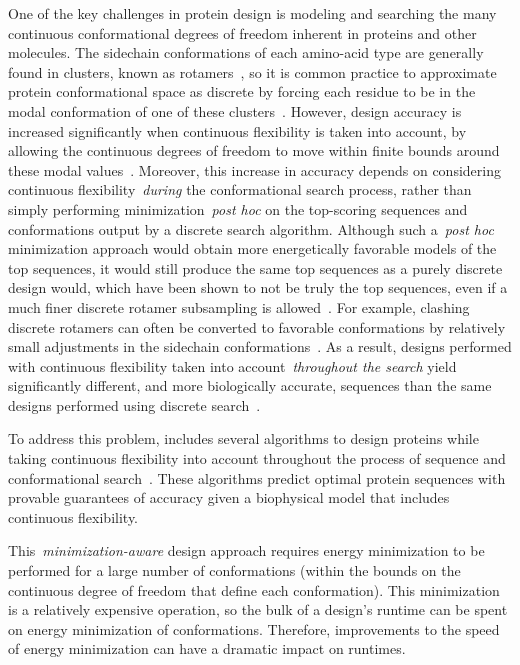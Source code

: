 One of the key challenges in protein design is modeling and searching the many continuous conformational degrees of freedom inherent in proteins and other molecules. The sidechain conformations of each amino-acid type are generally found in clusters, known as rotamers~\cite{rotamers}, so it is common practice to approximate protein conformational space as discrete by forcing each residue to be in the modal conformation of one of these clusters~\cite{DEE,DEE/A*}.  However, design accuracy is increased significantly when continuous flexibility is taken into account, by allowing the continuous degrees of freedom to move within finite bounds around these modal values~\cite{iMinDEE,DEEPer,OSPREY_MIE,BBK*}.  Moreover, this increase in accuracy depends on considering continuous flexibility~\textit{during} the conformational search process, rather than simply performing minimization~\textit{post hoc} on the top-scoring sequences and conformations output by a discrete search algorithm.  Although such a~\textit{post hoc} minimization approach would obtain more energetically favorable models of the top sequences, it would still produce the same top sequences as a purely discrete design would, which have been shown to not be truly the top sequences, even if a much finer discrete rotamer subsampling is allowed~\cite{iMinDEE,OSPREY_MIE}.  For example, clashing discrete rotamers can often be converted to favorable conformations by relatively small adjustments in the sidechain conformations~\cite{minDEE,iMinDEE,DEEPer,CATS}.  As a result, designs performed with continuous flexibility taken into account~\textit{throughout the search} yield significantly different, and more biologically accurate, sequences than the same designs performed using discrete search~\cite{iMinDEE,DEEPer,OSPREY_MIE}.  

To address this problem, \osprey includes several algorithms to design proteins while taking continuous flexibility into account throughout the process of sequence and conformational search~\cite{minDEE,iMinDEE,DEEPer,EPIC,LUTE_RECOMB,CATS}.   These algorithms predict optimal protein sequences with provable guarantees of accuracy given a biophysical model that includes continuous flexibility.  

This~\textit{minimization-aware} design approach requires energy minimization to be performed for a large number of conformations (within the bounds on the continuous degree of freedom that define each conformation).  This minimization is a relatively expensive operation, so the bulk of a design's runtime can be spent on energy minimization of conformations. Therefore, improvements to the speed of energy minimization can have a dramatic impact on \osprey runtimes.  

